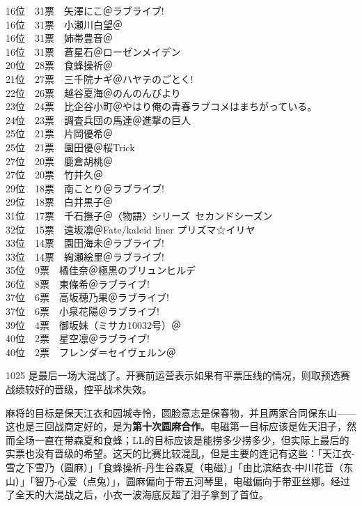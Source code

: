 {    16位　31票　矢澤にこ＠ラブライブ!\\
    16位　31票　小瀬川白望＠\Saki\\
    16位　31票　姉帯豊音＠\Saki\\
    16位　31票　蒼星石＠ローゼンメイデン\\
    20位　28票　食蜂操祈＠\Railgan\\
    21位　27票　三千院ナギ＠ハヤテのごとく!\\
    22位　26票　越谷夏海＠のんのんびより\\
    23位　24票　比企谷小町＠やはり俺の青春ラブコメはまちがっている。\\
    24位　23票　調査兵団の馬達＠進撃の巨人\\
    25位　21票　片岡優希＠\Saki\\
    25位　21票　園田優＠桜Trick\\
    27位　20票　鹿倉胡桃＠\Saki\\
    27位　20票　竹井久＠\Saki\\
    29位　18票　南ことり＠ラブライブ!\\
    29位　18票　白井黒子＠\Railgan\\
    31位　17票　千石撫子＠〈物語〉シリーズ~セカンドシーズン\\
    32位　15票　遠坂凛＠Fate/kaleid liner プリズマ☆イリヤ\\
    33位　14票　園田海未＠ラブライブ!\\
    33位　14票　絢瀬絵里＠ラブライブ!\\
    35位　9票　橘佳奈＠極黒のブリュンヒルデ\\
    36位　8票　東條希＠ラブライブ!\\
    37位　6票　高坂穂乃果＠ラブライブ!\\
    37位　6票　小泉花陽＠ラブライブ!\\
    39位　4票　御坂妹（ミサカ10032号）＠\Railgan\\
    40位　2票　星空凛＠ラブライブ!\\
    40位　2票　フレンダ＝セイヴェルン＠\Railgan
}

1025 是最后一场大混战了。开赛前运营表示如果有平票压线的情况，则取预选赛战绩较好的晋级，控平战术失效。

麻将的目标是保天江衣和园城寺怜，圆脸意志是保春物，并且两家合同保东山——这也是三回战商定好的，是为\textbf{第十次圆麻合作}。电磁第一目标应该是佐天泪子，然而全场一直在带森夏和食蜂；LL的目标应该是能捞多少捞多少，但实际上最后的实票也没有晋级的希望。这天的比赛比较混乱，但是主要的连记有这些：「天江衣-雪之下雪乃（圆麻）」「食蜂操祈-丹生谷森夏（电磁）」「由比滨结衣-中川花音（东山）」「智乃-心爱（点兔）」，圆麻偏向于带五河琴里，电磁偏向于带亚丝娜。经过了全天的大混战之后，小衣一波海底反超了泪子拿到了首位。

